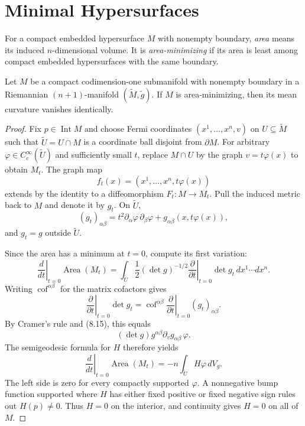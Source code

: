\section{Minimal Hypersurfaces}

For a compact embedded hypersurface $M$ with nonempty boundary, \emph{area}
means its induced $n$-dimensional volume. It is \emph{area-minimizing} if its
area is least among compact embedded hypersurfaces with the same boundary.

\begin{theorem}
\label{thm:area-minimizing-zero-mean-curvature}
Let $M$ be a compact codimension-one submanifold with nonempty boundary in a
Riemannian $(n+1)$-manifold $(\widetilde M,\widetilde g)$. If $M$ is
area-minimizing, then its mean curvature vanishes identically.
\end{theorem}

\begin{proof}
\sketch Fix $p\in\operatorname{Int}M$ and choose Fermi coordinates
$(x^1,\ldots,x^n,v)$ on $U\subseteq\widetilde M$ such that
$\widetilde U=U\cap M$ is a coordinate ball disjoint from $\partial M$.
For arbitrary $\varphi\in C_c^\infty(\widetilde U)$ and sufficiently small
$t$, replace $M\cap U$ by the graph $v=t\varphi(x)$ to obtain $M_t$. The graph
map
\[
f_t(x)=(x^1,\ldots,x^n,t\varphi(x))
\]
extends by the identity to a diffeomorphism $F_t\colon M\to M_t$. Pull the
induced metric back to $M$ and denote it by $g_t$. On $\widetilde U$,
\begin{equation}
(g_t)_{\alpha\beta}
=t^2\partial_\alpha\varphi\,\partial_\beta\varphi
+g_{\alpha\beta}(x,t\varphi(x)), \tag{8.15}
\end{equation}
and $g_t=g$ outside $\widetilde U$.

Since the area has a minimum at $t=0$, compute its first variation:
\begin{equation}
\left.\frac d{dt}\right|_{t=0}\operatorname{Area}(M_t)
=\int_{\widetilde U}\frac12(\det g)^{-1/2}
 \left.\frac\partial{\partial t}\right|_{t=0}\det g_t
 \,dx^1\cdots dx^n. \tag{8.16}
\end{equation}
Writing $\operatorname{cof}^{\alpha\beta}$ for the matrix cofactors gives
\begin{equation}
\left.\frac\partial{\partial t}\right|_{t=0}\det g_t
=\operatorname{cof}^{\alpha\beta}
 \left.\frac\partial{\partial t}\right|_{t=0}(g_t)_{\alpha\beta}. \tag{8.17}
\end{equation}
By Cramer's rule and (8.15), this equals
\[
(\det g)g^{\alpha\beta}\partial_vg_{\alpha\beta}\,\varphi.
\]
The semigeodesic formula for $H$ therefore yields
\begin{equation}
\left.\frac d{dt}\right|_{t=0}\operatorname{Area}(M_t)
=-n\int_{\widetilde U}H\varphi\,dV_g. \tag{8.18}
\end{equation}
The left side is zero for every compactly supported $\varphi$. A nonnegative
bump function supported where $H$ has either fixed positive or fixed negative
sign rules out $H(p)\ne0$. Thus $H=0$ on the interior, and continuity gives
$H=0$ on all of $M$.
\end{proof}

